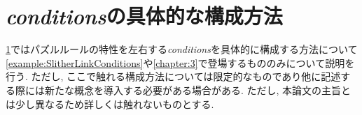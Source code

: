 

\section{{\it conditions}の具体的な構成方法}\label{section:ConcreteConditions}
\cref{section:ConcreteConditions}ではパズルルールの特性を左右する\textit{conditions}を具体的に構成する方法について\cref{example:SlitherLinkConditions}や\cref{chapter:3}で登場するもののみについて説明を行う. ただし, ここで触れる構成方法については限定的なものであり他に記述する際には新たな概念を導入する必要がある場合がある. ただし, 本論文の主旨とは少し異なるため詳しくは触れないものとする.
